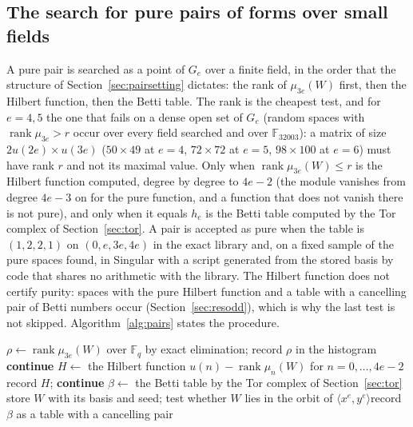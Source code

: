 \documentclass[11pt]{article}
\theoremstyle{definition}
\theoremstyle{remark}
\newcommand{\F}{\mathbb{F}}
\begin{document}
\subsection{The search for pure pairs of forms over small fields}
\label{sec:pairsearch}

A pure pair is searched as a point of $G_e$ over a finite field, in the order that the structure of Section~\ref{sec:pairsetting} dictates: the rank of $\mu_{3e}(W)$ first, then the Hilbert function, then the Betti table. The rank is the cheapest test, and for $e=4,5$ the one that fails on a dense open set of $G_e$ (random spaces with $\operatorname{rank}\mu_{3e}>r$ occur over every field searched and over $\F_{32003}$): a matrix of size $2u(2e)\times u(3e)$ ($50\times49$ at $e=4$, $72\times72$ at $e=5$, $98\times100$ at $e=6$) must have rank $r$ and not its maximal value. Only when $\operatorname{rank}\mu_{3e}(W)\le r$ is the Hilbert function computed, degree by degree to $4e-2$ (the module vanishes from degree $4e-3$ on for the pure function, and a function that does not vanish there is not pure), and only when it equals $h_e$ is the Betti table computed by the Tor complex of Section~\ref{sec:tor}. A pair is accepted as pure when the table is $(1,2,2,1)$ on $(0,e,3e,4e)$ in the exact library and, on a fixed sample of the pure spaces found, in Singular with a script generated from the stored basis by code that shares no arithmetic with the library. The Hilbert function does not certify purity: spaces with the pure Hilbert function and a table with a cancelling pair of Betti numbers occur (Section~\ref{sec:resodd}), which is why the last test is not skipped. Algorithm~\ref{alg:pairs} states the procedure.

\begin{algorithm}[htbp]
\caption{Search for pure pairs over $\F_q$. Input: $e$, a finite field $\F_q$, a list of spaces $W\subset U_e$ (all of them, or random draws with seeds $20261120+$ the index in the family and field, possibly stopped once $40$ pure spaces are found), $r=2u(2e)-2$. Output: the counts by rank of $\mu_{3e}$, by Hilbert function and by Betti table, and the pure spaces with their bases.}
\label{alg:pairs}
\begin{algorithmic}[1]
  \State $\rho\gets\operatorname{rank}\mu_{3e}(W)$ over $\F_q$ by exact elimination; record $\rho$ in the histogram
  \State \textbf{continue}\EndIf
  \State $H\gets$ the Hilbert function $u(n)-\operatorname{rank}\mu_n(W)$ for $n=0,\dots,4e-2$
  \State record $H$; \textbf{continue}\EndIf
  \State $\beta\gets$ the Betti table by the Tor complex of Section~\ref{sec:tor}
  \State store $W$ with its basis and seed; test whether $W$ lies in the orbit of $\langle x^e,y^e\rangle$\Else\State record $\beta$ as a table with a cancelling pair\EndIf
\EndFor
\end{algorithmic}
\end{algorithm}
\end{document}
